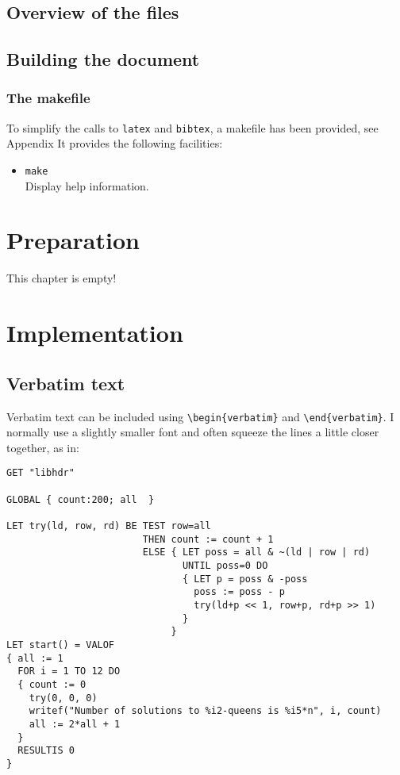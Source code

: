 \documentclass[12pt,twoside,notitlepage]{report}
\renewcommand{\baselinestretch}{1.1}    %
\begin{document}
\section{Overview of the files}

\section{Building the document}

\subsection{The makefile}

To simplify the calls to {\tt latex} and {\tt bibtex},
a makefile has been provided, see Appendix %
It provides the following facilities:

\begin{itemize}

\item{\tt make} \\
 Display help information.


\end{itemize}




\cleardoublepage



\chapter{Preparation}

This chapter is empty!


\cleardoublepage
\chapter{Implementation}

\section{Verbatim text}

Verbatim text can be included using \verb|\begin{verbatim}| and
\verb|\end{verbatim}|. I normally use a slightly smaller font and
often squeeze the lines a little closer together, as in:

{\renewcommand{\baselinestretch}{0.8}\small\begin{verbatim}
GET "libhdr"

GLOBAL { count:200; all  }

LET try(ld, row, rd) BE TEST row=all
                        THEN count := count + 1
                        ELSE { LET poss = all & ~(ld | row | rd)
                               UNTIL poss=0 DO
                               { LET p = poss & -poss
                                 poss := poss - p
                                 try(ld+p << 1, row+p, rd+p >> 1)
                               }
                             }
LET start() = VALOF
{ all := 1
  FOR i = 1 TO 12 DO
  { count := 0
    try(0, 0, 0)
    writef("Number of solutions to %i2-queens is %i5*n", i, count)
    all := 2*all + 1
  }
  RESULTIS 0
}
\end{verbatim}
}
\end{document}
